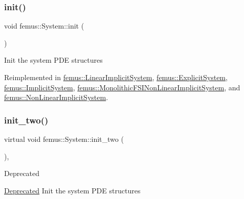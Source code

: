 \mbox{\label{classfemus_1_1_system_a1defaa9e59d3aa2ac62aa7fa111b6e32}} 
\subsubsection{\texorpdfstring{init()}{init()}}
{\footnotesize\ttfamily void femus\+::\+System\+::init (\begin{DoxyParamCaption}{ }\end{DoxyParamCaption})\hspace{0.3cm}{\ttfamily [virtual]}}

Init the system P\+DE structures 

Reimplemented in \mbox{\hyperlink{classfemus_1_1_linear_implicit_system_a4605bac9ea670bb7dbd4454358155670}{femus\+::\+Linear\+Implicit\+System}}, \mbox{\hyperlink{classfemus_1_1_explicit_system_a6736fef684fe763b26e016ff3f8b37b7}{femus\+::\+Explicit\+System}}, \mbox{\hyperlink{classfemus_1_1_implicit_system_a098b8d66e167a03759ca089bf0f0dc11}{femus\+::\+Implicit\+System}}, \mbox{\hyperlink{classfemus_1_1_monolithic_f_s_i_non_linear_implicit_system_a07e04a8cce138cae9edcdd05fd1c7829}{femus\+::\+Monolithic\+F\+S\+I\+Non\+Linear\+Implicit\+System}}, and \mbox{\hyperlink{classfemus_1_1_non_linear_implicit_system_ad2d20975e0c919a9d99bdd9368a0212a}{femus\+::\+Non\+Linear\+Implicit\+System}}.

\mbox{\label{classfemus_1_1_system_ae238425d65a58eb22b3925309d9d0bef}} 
\subsubsection{\texorpdfstring{init\+\_\+two()}{init\_two()}}
{\footnotesize\ttfamily virtual void femus\+::\+System\+::init\+\_\+two (\begin{DoxyParamCaption}{ }\end{DoxyParamCaption})\hspace{0.3cm}{\ttfamily [inline]}, {\ttfamily [virtual]}}

\begin{DoxyRefDesc}{Deprecated}
\item[\mbox{\hyperlink{deprecated__deprecated000014}{Deprecated}}]Init the system P\+DE structures \end{DoxyRefDesc}


